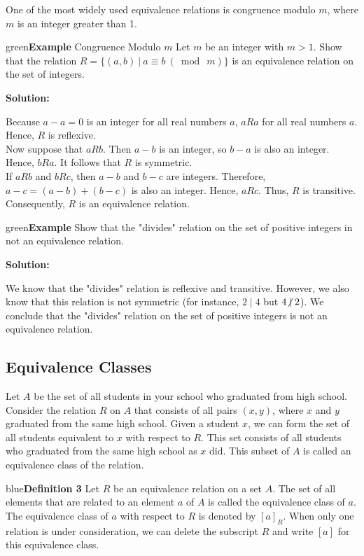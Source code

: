 \documentclass[11pt]{article}
\newenvironment{example}[1][\unskip]{\begin{mybox}{green}{\textbf{Example} {#1}}}{\end{mybox}}
\newenvironment{definition}[1]{\begin{mybox}{blue}{\textbf{Definition #1}}}{\end{mybox}}
\begin{document}
One of the most widely used equivalence relations is congruence modulo $m$, where $m$ is an integer greater than 1.

\begin{example}[Congruence Modulo $m$]
Let $m$ be an integer with $m > 1$. Show that the relation $R = \{(a, b)\ |\ a \equiv b\ (\bmod{\ m})\}$ is an equivalence relation on the set of integers.

\textbf{Solution:}

Because $a-a = 0$ is an integer for all real numbers $a$, $a R a$ for all real numbers $a$. Hence, $R$ is reflexive.\\
Now suppose that $a R b$. Then $a-b$ is an integer, so $b-a$ is also an integer. Hence, $b R a$. It follows that $R$ is symmetric.\\
If $a R b$ and $b R c$, then $a-b$ and $b-c$ are integers. Therefore, $a-c = (a-b) + (b-c)$ is also an integer. Hence, $a R c$. Thus, $R$ is transitive.\\
Consequently, $R$ is an equivalence relation.
\end{example}

\begin{example}
Show that the "divides" relation on the set of positive integers in not an equivalence relation.

\textbf{Solution:}

We know that the "divides" relation is reflexive and transitive. However, we also know that this relation is not symmetric (for instance, $2 \mid 4$ but $4 \centernot{|} 2$). We conclude that the "divides" relation on the set of positive integers is not an equivalence relation.
\end{example}

\subsection{Equivalence Classes}

Let $A$ be the set of all students in your school who graduated from high school. Consider the relation $R$ on $A$ that consists of all pairs $(x, y)$, where $x$ and $y$ graduated from the same high school. Given a student $x$, we can form the set of all students equivalent to $x$ with respect to $R$. This set consists of all students who graduated from the same high school as $x$ did. This subset of $A$ is called an equivalence class of the relation.

\begin{definition}{3}
Let $R$ be an equivalence relation on a set $A$. The set of all elements that are related to an element $a$ of $A$ is called the equivalence class of $a$. The equivalence class of $a$ with respect to $R$ is denoted by $[a]_R$. When only one relation is under consideration, we can delete the subscript $R$ and write $[a]$ for this equivalence class.
\end{definition}
\end{document}
